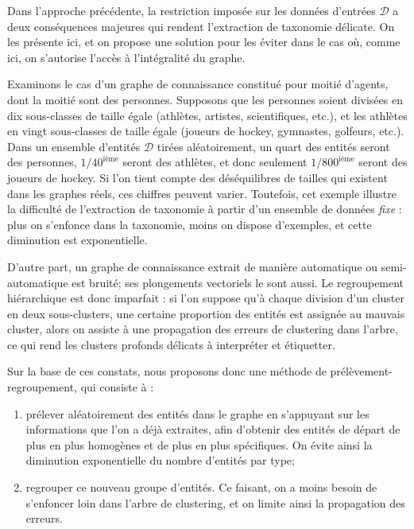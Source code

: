 Dans l'approche précédente, la restriction imposée sur les données d'entrées $\mathcal{D}$ a deux conséquences majeures qui rendent l'extraction de taxonomie délicate. On les présente ici, et on propose une solution pour les éviter dans le cas où, comme ici, on s'autorise l'accès à l'intégralité du graphe.


Examinons le cas d'un graphe de connaissance constitué pour moitié d'agents, dont la moitié sont des personnes. Supposons que les personnes soient divisées en dix sous-classes de taille égale (athlètes, artistes, scientifiques, etc.), et les athlètes en vingt sous-classes de taille égale (joueurs de hockey, gymnastes, golfeurs, etc.). Dans un ensemble d'entités $\mathcal{D}$ tirées aléatoirement, un quart des entités seront des personnes, $1/40^\textrm{ième}$ seront des athlètes, et donc seulement $1/800^\textrm{ième}$ seront des joueurs de hockey. Si l'on tient compte des déséquilibres de tailles qui existent dans les graphes réels, ces chiffres peuvent varier. Toutefois, cet exemple illustre la difficulté de l'extraction de taxonomie à partir d'un ensemble de données \textit{fixe} : plus on s'enfonce dans la taxonomie, moins on dispose d'exemples, et cette diminution est exponentielle.

D'autre part, un graphe de connaissance extrait de manière automatique ou semi-automatique est bruité; ses plongements vectoriels le sont aussi. Le regroupement hiérarchique est donc imparfait : si l'on suppose qu'à chaque division d'un cluster en deux sous-clusters, une certaine proportion des entités est assignée au mauvais cluster, alors on assiste à une propagation des erreurs de clustering dans l'arbre, ce qui rend les clusters profonds délicats à interpréter et étiquetter. 

Sur la base de ces constats, nous proposons donc une méthode de prélèvement-regroupement, qui consiste à :
\renewcommand{\theenumi}{\alph{enumi}}
\begin{enumerate}
    \item prélever aléatoirement des entités dans le graphe en s'appuyant sur les informations que l'on a déjà extraites, afin d'obtenir des entités de départ de plus en plus homogènes et de plus en plus spécifiques. On évite ainsi la diminution exponentielle du nombre d'entités par type;
    \item regrouper ce nouveau groupe d'entités. Ce faisant, on a moins besoin de s'enfoncer loin dans l'arbre de clustering, et on  limite ainsi la propagation des erreurs.
\end{enumerate}

